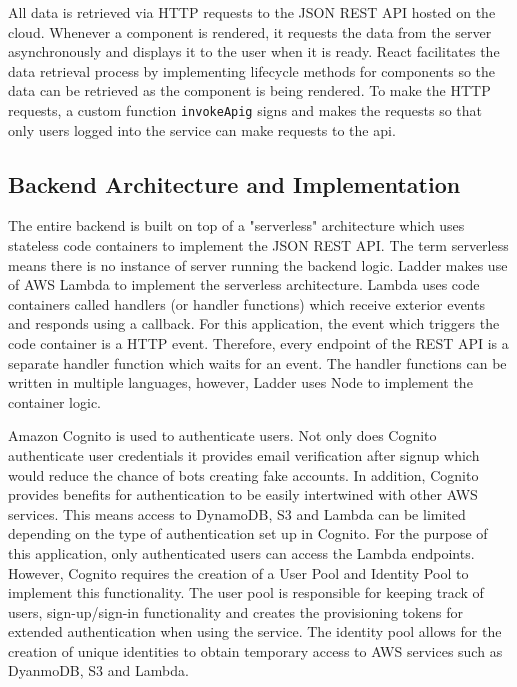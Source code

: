\documentclass[conference]{IEEEtran}
\begin{document}
All data is retrieved via HTTP requests to the JSON REST API hosted on the cloud. Whenever a component is rendered, it requests the data from the server asynchronously and displays it to the user when it is ready. React facilitates the data retrieval process by implementing lifecycle methods for components so the data can be retrieved as the component is being rendered. To make the HTTP requests, a custom function \verb|invokeApig| signs and makes the requests so that only users logged into the service can make requests to the api.

\subsection{Backend Architecture and Implementation}
The entire backend is built on top of a "serverless" architecture which uses stateless code containers to implement the JSON REST API. The term serverless means there is no instance of server running the backend logic. Ladder makes use of AWS Lambda to implement the serverless architecture. Lambda uses code containers called handlers (or handler functions) which receive exterior events and responds using a callback. For this application, the event which triggers the code container is a HTTP event. Therefore, every endpoint of the REST API is a separate handler function which waits for an event. The handler functions can be written in multiple languages, however, Ladder uses Node to implement the container logic.

Amazon Cognito is used to authenticate users. Not only does Cognito authenticate user credentials it provides email verification after signup which would reduce the chance of bots creating fake accounts. In addition, Cognito provides benefits for authentication to be easily intertwined with other AWS services. This means access to DynamoDB, S3 and Lambda can be limited depending on the type of authentication set up in Cognito. For the purpose of this application, only authenticated users can access the Lambda endpoints. However, Cognito requires the creation of a User Pool and Identity Pool to implement this functionality. The user pool is responsible for keeping track of users, sign-up/sign-in functionality and creates the provisioning tokens for extended authentication when using the service. The identity pool allows for the creation of unique identities to obtain temporary access to AWS services such as DyanmoDB, S3 and Lambda.
\end{document}
